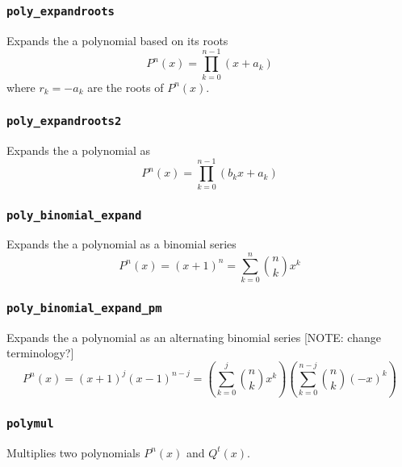 \subsubsection{{\tt poly\_expandroots}}
Expands the a polynomial based on its roots
\[
    P^n(x) = \prod_{k=0}^{n-1}{(x+a_k)}
\]
where $r_k=-a_k$ are the roots of $P^n(x)$.

\subsubsection{{\tt poly\_expandroots2}}
Expands the a polynomial as
\[
    P^n(x) = \prod_{k=0}^{n-1}{(b_kx+a_k)}
\]

\subsubsection{{\tt poly\_binomial\_expand}}
Expands the a polynomial as a binomial series
\[
    P^n(x) = (x+1)^n = \sum_{k=0}^{n}{ {n \choose k} x^k}
\]

\subsubsection{{\tt poly\_binomial\_expand\_pm}}
Expands the a polynomial as an alternating binomial series
[NOTE: change terminology?]
\[
    P^n(x) = (x+1)^j (x-1)^{n-j}
           = \left( \sum_{k=0}^{j}  { {n \choose k}    x^k} \right)
             \left( \sum_{k=0}^{n-j}{ {n \choose k} (-x)^k} \right)
\]

\subsubsection{{\tt polymul}}
Multiplies two polynomials $P^n(x)$ and $Q^t(x)$.

